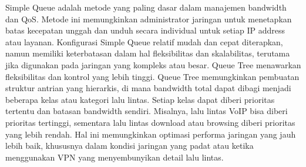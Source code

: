 Simple Queue adalah metode yang paling dasar dalam manajemen bandwidth dan QoS. Metode ini memungkinkan administrator jaringan untuk menetapkan batas kecepatan unggah dan unduh secara individual untuk setiap IP address atau layanan. Konfigurasi Simple Queue relatif mudah dan cepat diterapkan, namun memiliki keterbatasan dalam hal fleksibilitas dan skalabilitas, terutama jika digunakan pada jaringan yang kompleks atau besar. Queue Tree menawarkan fleksibilitas dan kontrol yang lebih tinggi. Queue Tree memungkinkan pembuatan struktur antrian yang hierarkis, di mana bandwidth total dapat dibagi menjadi beberapa kelas atau kategori lalu lintas. Setiap kelas dapat diberi prioritas tertentu dan batasan bandwidth sendiri. Misalnya, lalu lintas VoIP bisa diberi prioritas tertinggi, sementara lalu lintas download atau browsing diberi prioritas yang lebih rendah. Hal ini memungkinkan optimasi performa jaringan yang jauh lebih baik, khususnya dalam kondisi jaringan yang padat atau ketika menggunakan VPN yang menyembunyikan detail lalu lintas.
